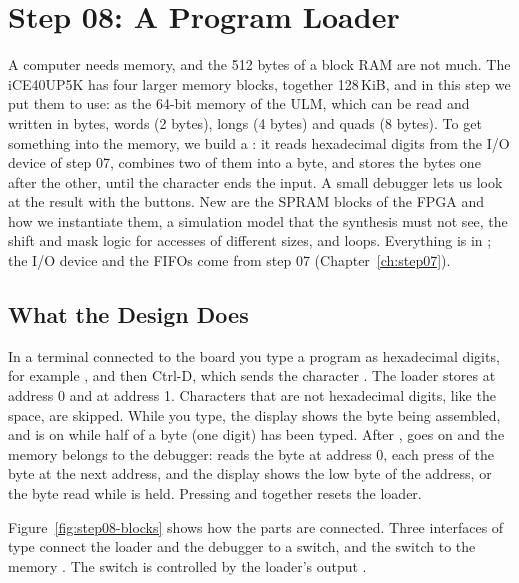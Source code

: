 \chapter{Step 08: A Program Loader}
\label{ch:step08}

A computer needs memory, and the 512 bytes of a block RAM are not much. The
iCE40UP5K has four larger memory blocks, together 128\,KiB, and in this step we
put them to use: as the 64-bit memory of the ULM, which can be read and written
in bytes, words (2 bytes), longs (4 bytes) and quads (8 bytes). To get
something into the memory, we build a : it reads hexadecimal
digits from the I/O device of step 07, combines two of them into a byte, and
stores the bytes one after the other, until the character  ends the
input. A small debugger lets us look at the result with the buttons. New are
the SPRAM blocks of the FPGA and how we instantiate them, a simulation model
that the synthesis must not see, the shift and mask logic for accesses of
different sizes, and  loops. Everything is in ; the
I/O device and the FIFOs come from step 07 (Chapter~\ref{ch:step07}).

\section{What the Design Does}
\label{sec:step08-design}

In a terminal connected to the board you type a program as hexadecimal
digits, for example , and then Ctrl-D, which sends the character
. The loader stores  at address 0 and  at address 1.
Characters that are not hexadecimal digits, like the space, are skipped. While
you type, the display shows the byte being assembled, and  is on
while half of a byte (one digit) has been typed. After , 
goes on and the memory belongs to the debugger:  reads the byte at
address 0, each press of  the byte at the next address, and the
display shows the low byte of the address, or the byte read while 
is held.
Pressing  and  together resets the loader.

Figure~\ref{fig:step08-blocks} shows how the parts are connected. Three
interfaces of type  connect the loader and the debugger to a switch,
and the switch to the memory . The switch is controlled by the
loader's output .

